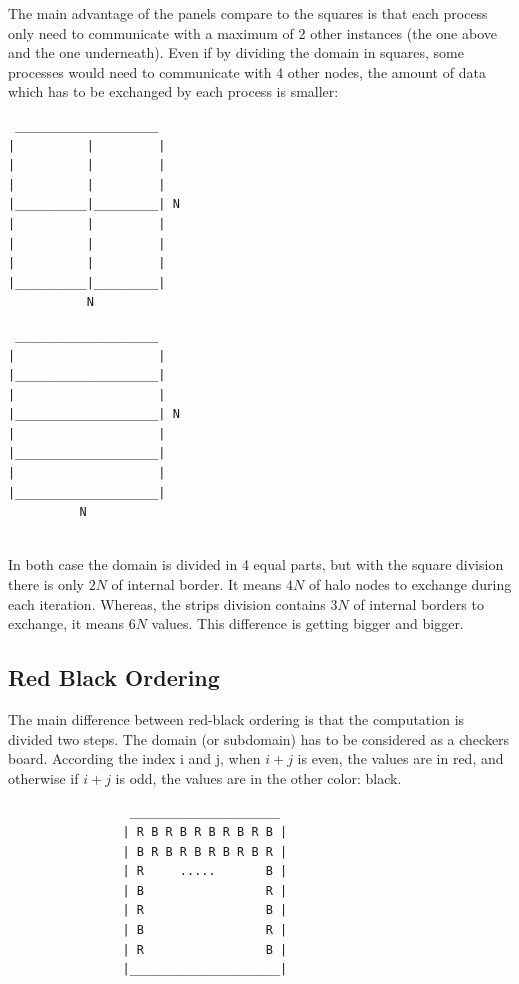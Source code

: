 \documentclass[a4paper,11pt]{article}
\begin{document}
The main advantage of the panels compare to the squares is that each process only need to
communicate with a maximum of 2 other instances (the one above and the one underneath).
Even if by dividing the domain in squares, some processes would need to communicate with
4 other nodes, the amount of data which has to be exchanged by each process is smaller:

\begin{multicols}{2}
\begin{verbatim}
 ____________________
|          |         |
|          |         |
|          |         |
|__________|_________| N
|          |         |
|          |         |
|          |         |
|__________|_________|
           N
\end{verbatim}
\begin{verbatim}
 ____________________
|                    |
|____________________|
|                    |
|____________________| N
|                    |
|____________________|
|                    |
|____________________|
          N
           
\end{verbatim}
\end{multicols}

In both case the domain is divided in 4 equal parts, but with the square division 
there is only $2N$ of internal border. It means $4N$ of halo nodes to exchange
during each iteration. Whereas, the strips division contains $3N$ of internal borders to
exchange, it means $6N$ values. This difference is getting bigger and bigger.

\subsection{Red Black Ordering}

The main difference between red-black ordering is that the computation is divided two steps.
The domain (or subdomain) has to be considered as a checkers board. According the index i and j, when
$i+j$ is even, the values are in red, and otherwise if $i+j$ is odd, the values are in the
other color: black.

\begin{verbatim}
                 _____________________
                | R B R B R B R B R B |
                | B R B R B R B R B R |
                | R     .....       B |
                | B                 R |
                | R                 B |
                | B                 R |
                | R                 B |
                |_____________________|
\end{verbatim}
\end{document}
